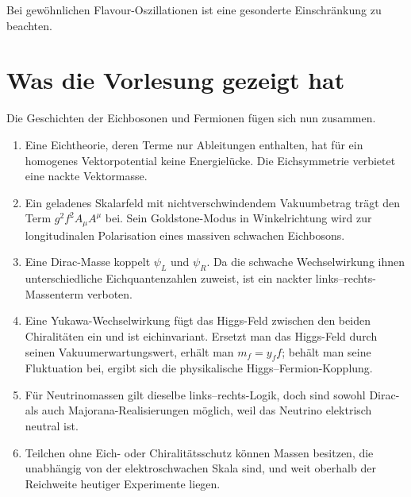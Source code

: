 Bei gewöhnlichen Flavour-Oszillationen ist eine gesonderte Einschränkung zu beachten.

\begin{classroomqa}
\end{classroomqa}

\section{Was die Vorlesung gezeigt hat}

Die Geschichten der Eichbosonen und Fermionen fügen sich nun zusammen.

\begin{enumerate}
  \item Eine Eichtheorie, deren Terme nur Ableitungen enthalten, hat für ein homogenes Vektorpotential keine Energielücke. Die Eichsymmetrie verbietet eine nackte Vektormasse.
  \item Ein geladenes Skalarfeld mit nichtverschwindendem Vakuumbetrag trägt den Term \(g^2f^2A_\mu A^\mu\) bei. Sein Goldstone-Modus in Winkelrichtung wird zur longitudinalen Polarisation eines massiven schwachen Eichbosons.
  \item Eine Dirac-Masse koppelt \(\psi_L\) und \(\psi_R\). Da die schwache Wechselwirkung ihnen unterschiedliche Eichquantenzahlen zuweist, ist ein nackter links--rechts-Massenterm verboten.
  \item Eine Yukawa-Wechselwirkung fügt das Higgs-Feld zwischen den beiden Chiralitäten ein und ist eichinvariant. Ersetzt man das Higgs-Feld durch seinen Vakuumerwartungswert, erhält man \(m_f=y_ff\); behält man seine Fluktuation bei, ergibt sich die physikalische Higgs--Fermion-Kopplung.
  \item Für Neutrinomassen gilt dieselbe links--rechts-Logik, doch sind sowohl Dirac- als auch Majorana-Realisierungen möglich, weil das Neutrino elektrisch neutral ist.
  \item Teilchen ohne Eich- oder Chiralitätsschutz können Massen besitzen, die unabhängig von der elektroschwachen Skala sind, und weit oberhalb der Reichweite heutiger Experimente liegen.
\end{enumerate}

